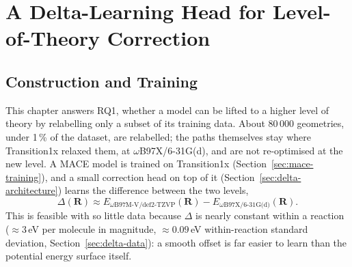 %
%
\usetikzlibrary{positioning, arrows.meta}

\chapter{A Delta-Learning Head for Level-of-Theory Correction}
\label{ch:delta}

\section{Construction and Training}
\label{sec:delta-overview}

This chapter answers RQ1, whether a model can be lifted to a higher
level of theory by relabelling only a subset of its training data.
About 80\,000 geometries, under 1\,\% of the dataset, are relabelled;
the paths
themselves stay where Transition1x relaxed them, at
\mbox{$\omega$B97X/6-31G(d)}, and are not re-optimised at the new
level. A MACE model is trained on Transition1x
(Section~\ref{sec:mace-training}), and a small correction head on top
of it (Section~\ref{sec:delta-architecture}) learns the difference
between the two levels,
%
\begin{equation}
\Delta(\mathbf{R}) \approx E_{\omega\text{B97M-V/def2-TZVP}}(\mathbf{R}) - E_{\omega\text{B97X/6-31G(d)}}(\mathbf{R}) .
\label{eq:delta-def}
\end{equation}
%
This is feasible with so little data because $\Delta$ is nearly
constant within a reaction ($\approx 3$\,eV per molecule in magnitude,
$\approx 0.09$\,eV within-reaction standard deviation,
Section~\ref{sec:delta-data}): a smooth offset is far easier to learn
than the potential energy surface itself.

